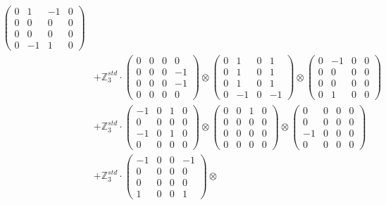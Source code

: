 \documentclass{article}
\begin{document}
{\begin{align}
            \begin{pmatrix} 0 & 1 & -1 & 0 \\ 0 & 0 & 0 & 0 \\ 0 & 0 & 0 & 0 \\ 0 & -1 & 1 & 0 \end{pmatrix} \\ 
        &+ \label{Rs16-Rc11-Solution-10-c25} \mathbb{Z}_3^{std} \cdot 
            \begin{pmatrix} 0 & 0 & 0 & 0 \\ 0 & 0 & 0 & -1 \\ 0 & 0 & 0 & -1 \\ 0 & 0 & 0 & 0 \end{pmatrix} \otimes 
            \begin{pmatrix} 0 & 1 & 0 & 1 \\ 0 & 1 & 0 & 1 \\ 0 & 1 & 0 & 1 \\ 0 & -1 & 0 & -1 \end{pmatrix} \otimes 
            \begin{pmatrix} 0 & -1 & 0 & 0 \\ 0 & 0 & 0 & 0 \\ 0 & 0 & 0 & 0 \\ 0 & 1 & 0 & 0 \end{pmatrix} \\ 
        &+ \label{Rs16-Rc11-Solution-10-c26} \mathbb{Z}_3^{std} \cdot 
            \begin{pmatrix} -1 & 0 & 1 & 0 \\ 0 & 0 & 0 & 0 \\ -1 & 0 & 1 & 0 \\ 0 & 0 & 0 & 0 \end{pmatrix} \otimes 
            \begin{pmatrix} 0 & 0 & 1 & 0 \\ 0 & 0 & 0 & 0 \\ 0 & 0 & 0 & 0 \\ 0 & 0 & 0 & 0 \end{pmatrix} \otimes 
            \begin{pmatrix} 0 & 0 & 0 & 0 \\ 0 & 0 & 0 & 0 \\ -1 & 0 & 0 & 0 \\ 0 & 0 & 0 & 0 \end{pmatrix} \\ 
        &+ \label{Rs16-Rc11-Solution-10-c27} \mathbb{Z}_3^{std} \cdot 
            \begin{pmatrix} -1 & 0 & 0 & -1 \\ 0 & 0 & 0 & 0 \\ 0 & 0 & 0 & 0 \\ 1 & 0 & 0 & 1 \end{pmatrix} \otimes 

\end{align}}
\end{document}
